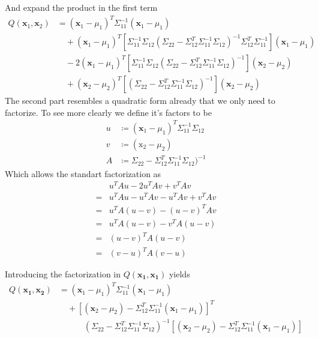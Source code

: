 \documentclass{article}
\begin{document}
And expand the product in the first term
\begin{align*}
Q\left(\mathbf{x}_{1}, \mathbf{x}_{2}\right) &= \left(\mathbf{x}_{1}-\mu_{1}\right)^{T} \Sigma_{11}^{-1}\left(\mathbf{x}_{1}-\mu_{1}\right) \\ 
&\quad+\left(\mathbf{x}_{1}-\mu_{1}\right)^{T}\left[\Sigma_{11}^{-1} \Sigma_{12}\left(\Sigma_{22}-\Sigma_{12}^{T} \Sigma_{11}^{-1} \Sigma_{12}\right)^{-1} \Sigma_{12}^{T} \Sigma_{11}^{-1}\right]\left(\mathbf{x}_{1}-\mu_{1}\right) \\
&\quad -2\left(\mathbf{x}_{1}-\mu_{1}\right)^{T}\left[\Sigma_{11}^{-1} \Sigma_{12}\left(\Sigma_{22}-\Sigma_{12}^{T} \Sigma_{11}^{-1} \Sigma_{12}\right)^{-1}\right]\left(\mathbf{x}_{2}-\mu_{2}\right) \\
&\quad +\left(\mathbf{x}_{2}-\mu_{2}\right)^{T}\left[\left(\Sigma_{22}-\Sigma_{12}^{T} \Sigma_{11}^{-1} \Sigma_{12}\right)^{-1}\right]\left(\mathbf{x}_{2}-\mu_{2}\right)
\end{align*}
The second part resembles a quadratic form already that we only need to factorize. To see more clearly we define it's factors to be
\begin{align*}
u &\coloneqq \left(\mathbf{x}_{1}-\mu_{1}\right)^{T}\Sigma_{11}^{-1} \Sigma_{12}\\
v &\coloneqq \left(\mathrm{x}_{2}-\mu_{2}\right) \\
A &\coloneqq \Sigma_{22}-\Sigma_{12}^{T} \Sigma_{11}^{-1} \Sigma_{12} )^{-1}
\end{align*}
Which allows the standart factorization as
\begin{align*}
&u^{T} A u-2 u^{T} A v+v^{T} A v \\
=& u^{T} A u-u^{T} A v-u^{T} A v+v^{T} A v \\
=& u^{T} A(u-v)-(u-v)^{T} A v \\
=& u^{T} A(u-v)-v^{T} A(u-v) \\
=& (u-v)^{T} A(u-v) \\
=&(v-u)^{T} A(v-u)
\end{align*}

Introducing the factorization in $Q(\mathbf{x_1},\mathbf{x_1})$ yields
{\small
\begin{align*}
Q(\mathbf{x_1},\mathbf{x_2}) &= \left(\mathbf{x}_{1}-\mu_{1}\right)^{T} \Sigma_{11}^{-1}\left(\mathbf{x}_{1}-\mu_{1}\right) \\
&\quad + \left[\left(\mathbf{x}_{2}-\mu_{2}\right)-\Sigma_{12}^{T} \Sigma_{11}^{-1}\left(\mathbf{x}_{1}-\mu_{1}\right)\right]^{T} \\
&\quad \quad \quad \left(\Sigma_{22}-\Sigma_{12}^{T} \Sigma_{11}^{-1} \Sigma_{12}\right)^{-1}\left[\left(\mathbf{x}_{2}-\mu_{2}\right)-\Sigma_{12}^{T} \Sigma_{11}^{-1}\left(\mathbf{x}_{1}-\mu_{1}\right)\right]
\end{align*}
}
\end{document}
